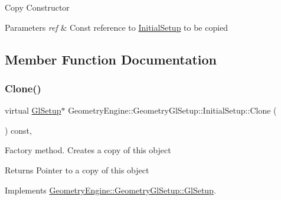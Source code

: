 Copy Constructor 
\begin{DoxyParams}{Parameters}
{\em ref} & Const reference to \mbox{\hyperlink{class_geometry_engine_1_1_geometry_gl_setup_1_1_initial_setup}{Initial\+Setup}} to be copied \\
\hline
\end{DoxyParams}


\subsection{Member Function Documentation}
\mbox{\label{class_geometry_engine_1_1_geometry_gl_setup_1_1_initial_setup_ade45cd909edd6ff3cae7323d5e1c53d0}} 
\subsubsection{\texorpdfstring{Clone()}{Clone()}}
{\footnotesize\ttfamily virtual \mbox{\hyperlink{class_geometry_engine_1_1_geometry_gl_setup_1_1_gl_setup}{Gl\+Setup}}$\ast$ Geometry\+Engine\+::\+Geometry\+Gl\+Setup\+::\+Initial\+Setup\+::\+Clone (\begin{DoxyParamCaption}{ }\end{DoxyParamCaption}) const\hspace{0.3cm}{\ttfamily [inline]}, {\ttfamily [virtual]}}

Factory method. Creates a copy of this object \begin{DoxyReturn}{Returns}
Pointer to a copy of this object 
\end{DoxyReturn}


Implements \mbox{\hyperlink{class_geometry_engine_1_1_geometry_gl_setup_1_1_gl_setup_adf97b18fd8af32c63a189983ab35d5ae}{Geometry\+Engine\+::\+Geometry\+Gl\+Setup\+::\+Gl\+Setup}}.

\mbox{\label{class_geometry_engine_1_1_geometry_gl_setup_1_1_initial_setup_a2140bf33e9792369fc60853c58fdc789}} 
